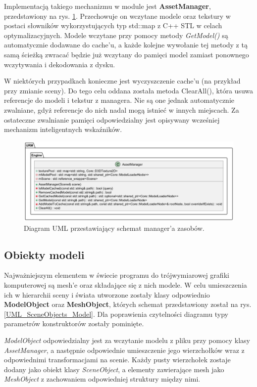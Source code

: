 	Implementacją takiego mechanizmu w module jest \textbf{AssetManager}, przedstawiony na rys. \ref{UML_AssetManager}. Przechowuje on wczytane modele oraz tekstury w postaci słowników wykorzystujących typ std::map z C++ STL w celach optymalizacyjnych. Modele wczytane przy pomocy metody \textit{GetModel()} są automatycznie dodawane do cache'u, a każde kolejne wywołanie tej metody z tą samą ścieżką zwracać będzie już wczytany do pamięci model zamiast ponownego wczytywania i dekodowania z dysku.
	
	W niektórych przypadkach konieczne jest wyczyszczenie cache'u (na przykład przy zmianie sceny). Do tego celu oddana została metoda ClearAll(), która usuwa referencje do modeli i tekstur z managera. Nie są one jednak automatycznie zwalniane, gdyż referencje do nich nadal mogą istnieć w innych miejscach. Za ostateczne zwalnianie pamięci odpowiedzialny jest opisywany wcześniej mechanizm inteligentnych wskaźników.
	
	\begin{figure}[h!]
		\centering
		\includegraphics[width=\textwidth]{images/UML/assets.png}
		\caption{Diagram UML przestawiający schemat manager'a zasobów.}
		\label{UML_AssetManager}
	\end{figure}
	
	
\subsection{Obiekty modeli}
	Najważniejszym elementem w świecie programu do trójwymiarowej grafiki komputerowej są mesh'e oraz składające się z nich modele. W celu umieszczenia ich w hierarchii sceny i świata utworzone zostały klasy odpowiednio \textbf{ModelObject} oraz \textbf{MeshObject}, których schemat przedstawiony został na rys. \ref{UML_SceneObjects_Model}. Dla poprawienia czytelności diagramu typy parametrów konstruktorów zostały pominięte.
	
	\textit{ModelObject} odpowiedzialny jest za wczytanie modelu z pliku przy pomocy klasy \textit{AssetManager}, a następnie odpowiednie umieszczenie jego wierzchołków wraz z odpowiednimi transformacjami na scenie. Każdy pusty wierzchołek zostaje dodany jako obiekt klasy \textit{SceneObject}, a elementy zawierające mesh jako \textit{MeshObject} z zachowaniem odpowiedniej struktury między nimi.
	
